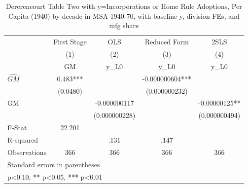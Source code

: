 \begin{table}[htbp]\centering
\def\sym#1{\ifmmode^{#1}\else\(^{#1}\)\fi}
\caption{Dererencourt Table Two with y=Incorporations or Home Rule Adoptions, Per Capita (1940) by decade in MSA 1940-70, with baseline y, division FEs, and mfg share}
\begin{tabular}{l*{4}{c}}
\toprule
                    & First Stage   &         OLS   &Reduced Form   &        2SLS   \\
                    &\multicolumn{1}{c}{(1)}&\multicolumn{1}{c}{(2)}&\multicolumn{1}{c}{(3)}&\multicolumn{1}{c}{(4)}\\
                    &\multicolumn{1}{c}{GM}&\multicolumn{1}{c}{y\_L0}&\multicolumn{1}{c}{y\_L0}&\multicolumn{1}{c}{y\_L0}\\
\midrule
$\hat{GM}$          &       0.483***&               &-0.000000604***&               \\
                    &    (0.0480)   &               &(0.000000232)   &               \\
\addlinespace
GM                  &               &-0.000000117   &               & -0.00000125** \\
                    &               &(0.000000228)   &               &(0.000000494)   \\
\midrule
F-Stat              &      22.201   &               &               &               \\
R-squared           &               &        .131   &        .147   &               \\
Observations        &         366   &         366   &         366   &         366   \\
\bottomrule
\multicolumn{5}{l}{\footnotesize Standard errors in parentheses}\\
\multicolumn{5}{l}{\footnotesize * p<0.10, ** p<0.05, *** p<0.01}\\
\end{tabular}
\end{table}
